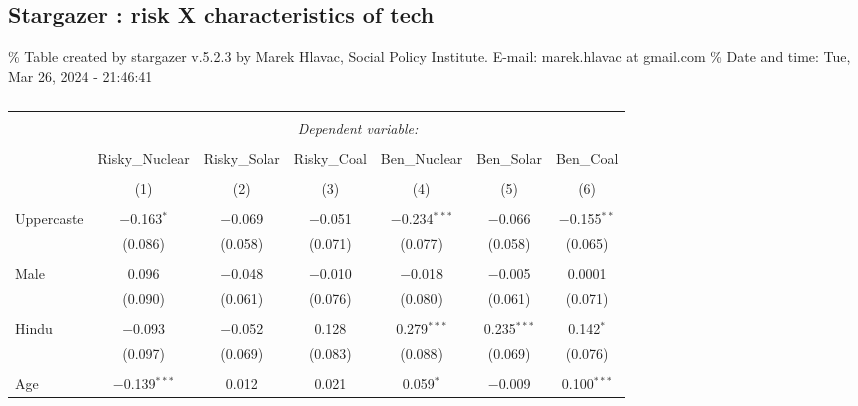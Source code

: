 \documentclass[
]{article}
\begin{document}
\newpage
\begin{landscape}

\hypertarget{stargazer-risk-x-characteristics-of-tech}{%
\subsection{Stargazer : risk X characteristics of
tech}\label{stargazer-risk-x-characteristics-of-tech}}

\begingroup\small\setlength{\tabcolsep}{1pt}

\renewcommand{\arraystretch}{0.7}

\% Table created by stargazer v.5.2.3 by Marek Hlavac, Social Policy
Institute. E-mail: marek.hlavac at gmail.com \% Date and time: Tue, Mar
26, 2024 - 21:46:41

\begin{table}[!htbp] \centering 
  \caption{} 
  \label{} 
\begin{tabular}{@{\extracolsep{5pt}}lcccccc} 
\\[-1.8ex]\hline 
\hline \\[-1.8ex] 
 & \multicolumn{6}{c}{\textit{Dependent variable:}} \\ 
\cline{2-7} 
\\[-1.8ex] & Risky\_Nuclear & Risky\_Solar & Risky\_Coal & Ben\_Nuclear & Ben\_Solar & Ben\_Coal \\ 
\\[-1.8ex] & (1) & (2) & (3) & (4) & (5) & (6)\\ 
\hline \\[-1.8ex] 
 Uppercaste & $-$0.163$^{*}$ & $-$0.069 & $-$0.051 & $-$0.234$^{***}$ & $-$0.066 & $-$0.155$^{**}$ \\ 
  & (0.086) & (0.058) & (0.071) & (0.077) & (0.058) & (0.065) \\ 
  & & & & & & \\ 
 Male & 0.096 & $-$0.048 & $-$0.010 & $-$0.018 & $-$0.005 & 0.0001 \\ 
  & (0.090) & (0.061) & (0.076) & (0.080) & (0.061) & (0.071) \\ 
  & & & & & & \\ 
 Hindu & $-$0.093 & $-$0.052 & 0.128 & 0.279$^{***}$ & 0.235$^{***}$ & 0.142$^{*}$ \\ 
  & (0.097) & (0.069) & (0.083) & (0.088) & (0.069) & (0.076) \\ 
  & & & & & & \\ 
 Age & $-$0.139$^{***}$ & 0.012 & 0.021 & 0.059$^{*}$ & $-$0.009 & 0.100$^{***}$ \\ 

\end{tabular}
\end{table}
\end{landscape}
\end{document}
